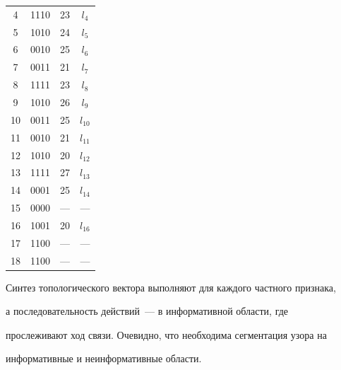 \begin{table}
\begin{minipage}[t]{60mm}
{\begin{center}
\begin{tabular}{|c|c|c|c|}
4&1110&23&$l_4$\\ 


5&1010&24&$l_5$\\ 


6&0010&25&$l_6$\\ 


7&0011&21&$l_7$\\ 


8&1111&23&$l_8$\\ 


9&1010&26&$l_9$\\ 


10\hphantom{9}&0011&25&$l_{10}$\\ 


11\hphantom{9}&0010&21&$l_{11}$\\ 


12\hphantom{9}&1010&20&$l_{12}$\\ 


13\hphantom{9}&1111&27&$l_{13}$\\ 


14\hphantom{9}&0001&25&$l_{14}$\\ 


15\hphantom{9}&0000&---&--- \\


16\hphantom{9}&1001&20&$l_{16}$\\ 


17\hphantom{9}&1100&---&--- \\


18\hphantom{9}&1100&---&---\\ 


\hline 


\end{tabular} 


\end{center} }


\end{minipage}


\end{table}


   


  


  Синтез топологического вектора выполняют для каждого частного признака, 


а последовательность действий~--- в информативной области, где 


прослеживают ход связи. Очевидно, что необходима сегментация узора на 


информативные и неинформативные области.


